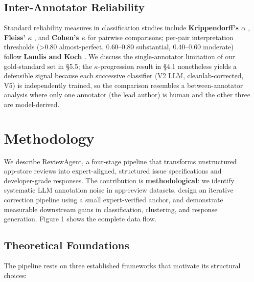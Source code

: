 \documentclass[sigconf, nonacm, anonymous, balance=false]{acmart}
\begin{document}
\subsection{Inter-Annotator Reliability}\label{inter-annotator-reliability}

Standard reliability measures in classification studies include \textbf{Krippendorff's $\alpha$} \cite{krippendorff2004content}, \textbf{Fleiss' $\kappa$} \cite{fleiss1971}, and \textbf{Cohen's $\kappa$} \cite{cohen1960} for pairwise comparisons; per-pair interpretation thresholds (\textgreater0.80 almost-perfect, 0.60--0.80 substantial, 0.40--0.60 moderate) follow \textbf{Landis and Koch} \cite{landis1977}. We discuss the single-annotator limitation of our gold-standard set in \S5.5; the $\kappa$-progression result in \S4.1 nonetheless yields a defensible signal because each successive classifier (V2 LLM, cleanlab-corrected, V5) is independently trained, so the comparison resembles a between-annotator analysis where only one annotator (the lead author) is human and the other three are model-derived.

\section{Methodology}\label{methodology}

We describe ReviewAgent, a four-stage pipeline that transforms unstructured app-store reviews into expert-aligned, structured issue specifications and developer-grade responses. The contribution is \textbf{methodological}: we identify systematic LLM annotation noise in app-review datasets, design an iterative correction pipeline using a small expert-verified anchor, and demonstrate measurable downstream gains in classification, clustering, and response generation. Figure 1 shows the complete data flow.

\subsection{Theoretical Foundations}\label{theoretical-foundations}

The pipeline rests on three established frameworks that motivate its structural choices:
\end{document}
